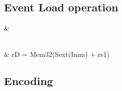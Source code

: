 \documentclass[letterpaper,10pt,english]{sphinxmanual}
\begin{document}
\subsection{Event Load operation}
\label{\detokenize{instruction_set_extensions:event-load-operation}}

\begin{savenotes}\sphinxattablestart
\sphinxthistablewithglobalstyle
\centering
{}
\sphinxthecaptionisattop
{}\label{\detokenize{instruction_set_extensions:id4}}
\sphinxaftertopcaption
\begin{tabular}[t]{}
\sphinxtoprule
\sphinxstyletheadfamily 
\sphinxAtStartPar
{}
&\sphinxstyletheadfamily 
\sphinxAtStartPar
{}
\\
\sphinxmidrule
\sphinxtableatstartofbodyhook{}%
%
\sphinxstopmulticolumn
\\
\sphinxhline
\sphinxAtStartPar
{}
&
\sphinxAtStartPar
rD = Mem32(Sext(Imm) + rs1)
\\
\sphinxbottomrule
\end{tabular}
\sphinxtableafterendhook\par
\sphinxattableend\end{savenotes}


\subsection{Encoding}
\label{\detokenize{instruction_set_extensions:id5}}
\end{document}
